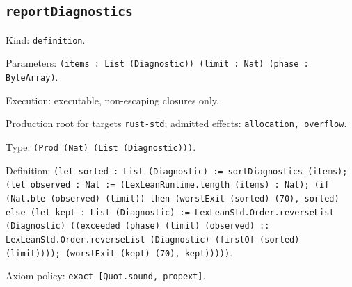 \documentclass[11pt]{article}
\begin{document}
\subsection*{\texttt{reportDiagnostics}}
\noindent Kind: \texttt{definition}.\par
\noindent Parameters: \texttt{(items : List (Diagnostic)) (limit : Nat) (phase : ByteArray)}.\par
\noindent Execution: executable, non-escaping closures only.\par
\noindent Production root for targets \texttt{rust-std}; admitted effects: \texttt{allocation, overflow}.\par
\noindent Type: \texttt{(Prod (Nat) (List (Diagnostic)))}.\par
\noindent Definition: \texttt{(let sorted : List (Diagnostic) := sortDiagnostics (items); (let observed : Nat := (LexLeanRuntime.length (items) : Nat); (if (Nat.ble (observed) (limit)) then (worstExit (sorted) (70), sorted) else (let kept : List (Diagnostic) := LexLeanStd.Order.reverseList (Diagnostic) ((exceeded (phase) (limit) (observed) :: LexLeanStd.Order.reverseList (Diagnostic) (firstOf (sorted) (limit)))); (worstExit (kept) (70), kept)))))}.\par
\noindent Axiom policy: \texttt{exact [Quot.sound, propext]}.\par
\end{document}
